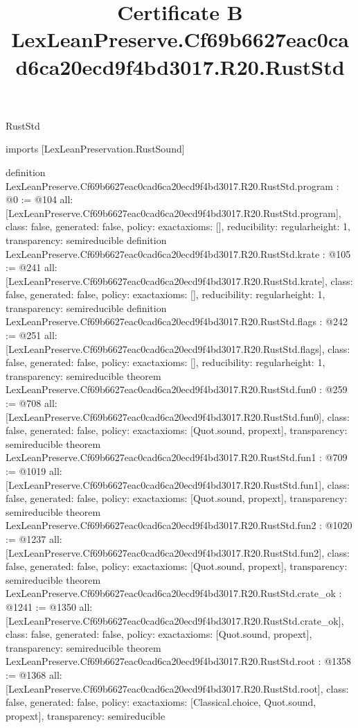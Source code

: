 \begin{lexlean}{RustStd}
\title{Certificate B LexLeanPreserve.Cf69b6627eac0cad6ca20ecd9f4bd3017.R20.RustStd}
\begin{coremodule}
imports [LexLeanPreservation.RustSound]

definition LexLeanPreserve.Cf69b6627eac0cad6ca20ecd9f4bd3017.R20.RustStd.program : @0 := @104 {
  all: [LexLeanPreserve.Cf69b6627eac0cad6ca20ecd9f4bd3017.R20.RustStd.program],
  class: false,
  generated: false,
  policy: exact{axioms: []},
  reducibility: regular{height: 1},
  transparency: semireducible
}
definition LexLeanPreserve.Cf69b6627eac0cad6ca20ecd9f4bd3017.R20.RustStd.krate : @105 := @241 {
  all: [LexLeanPreserve.Cf69b6627eac0cad6ca20ecd9f4bd3017.R20.RustStd.krate],
  class: false,
  generated: false,
  policy: exact{axioms: []},
  reducibility: regular{height: 1},
  transparency: semireducible
}
definition LexLeanPreserve.Cf69b6627eac0cad6ca20ecd9f4bd3017.R20.RustStd.flags : @242 := @251 {
  all: [LexLeanPreserve.Cf69b6627eac0cad6ca20ecd9f4bd3017.R20.RustStd.flags],
  class: false,
  generated: false,
  policy: exact{axioms: []},
  reducibility: regular{height: 1},
  transparency: semireducible
}
theorem LexLeanPreserve.Cf69b6627eac0cad6ca20ecd9f4bd3017.R20.RustStd.fun0 : @259 := @708 {
  all: [LexLeanPreserve.Cf69b6627eac0cad6ca20ecd9f4bd3017.R20.RustStd.fun0],
  class: false,
  generated: false,
  policy: exact{axioms: [Quot.sound, propext]},
  transparency: semireducible
}
theorem LexLeanPreserve.Cf69b6627eac0cad6ca20ecd9f4bd3017.R20.RustStd.fun1 : @709 := @1019 {
  all: [LexLeanPreserve.Cf69b6627eac0cad6ca20ecd9f4bd3017.R20.RustStd.fun1],
  class: false,
  generated: false,
  policy: exact{axioms: [Quot.sound, propext]},
  transparency: semireducible
}
theorem LexLeanPreserve.Cf69b6627eac0cad6ca20ecd9f4bd3017.R20.RustStd.fun2 : @1020 := @1237 {
  all: [LexLeanPreserve.Cf69b6627eac0cad6ca20ecd9f4bd3017.R20.RustStd.fun2],
  class: false,
  generated: false,
  policy: exact{axioms: [Quot.sound, propext]},
  transparency: semireducible
}
theorem LexLeanPreserve.Cf69b6627eac0cad6ca20ecd9f4bd3017.R20.RustStd.crate_ok : @1241 := @1350 {
  all: [LexLeanPreserve.Cf69b6627eac0cad6ca20ecd9f4bd3017.R20.RustStd.crate_ok],
  class: false,
  generated: false,
  policy: exact{axioms: [Quot.sound, propext]},
  transparency: semireducible
}
theorem LexLeanPreserve.Cf69b6627eac0cad6ca20ecd9f4bd3017.R20.RustStd.root : @1358 := @1368 {
  all: [LexLeanPreserve.Cf69b6627eac0cad6ca20ecd9f4bd3017.R20.RustStd.root],
  class: false,
  generated: false,
  policy: exact{axioms: [Classical.choice, Quot.sound, propext]},
  transparency: semireducible
}


\end{coremodule}
\end{lexlean}
